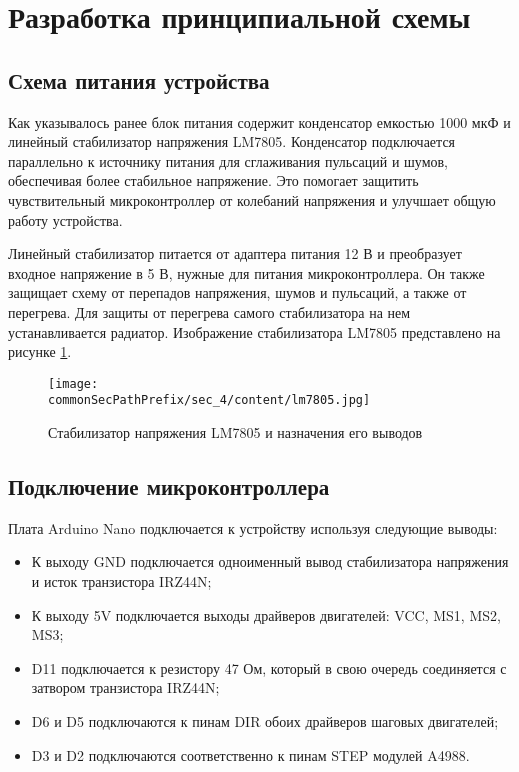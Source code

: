 \section{Разработка принципиальной схемы}
\label{sec:principal}

\subsection{Схема питания устройства}

Как указывалось ранее блок питания содержит конденсатор емкостью 1000 мкФ и линейный стабилизатор напряжения LM7805.
Конденсатор подключается параллельно к источнику питания для сглаживания пульсаций и шумов,
обеспечивая более стабильное напряжение. Это помогает защитить чувствительный микроконтроллер 
от колебаний напряжения и улучшает общую работу устройства.

Линейный стабилизатор питается от адаптера питания 12 В и преобразует входное напряжение в 5 В\cite{LM7805_sheet}, 
нужные для питания микроконтроллера. Он также защищает схему от перепадов напряжения, шумов и пульсаций, 
а также от перегрева\cite{schemt_3}. Для защиты от перегрева самого стабилизатора на нем устанавливается радиатор. 
Изображение стабилизатора LM7805 представлено на рисунке \ref{fig:lm7805}. 
\begin{figure}[ht]
    \centering
    \texttt{[image: \\commonSecPathPrefix/sec\_4/content/lm7805.jpg]}
    \caption{Стабилизатор напряжения LM7805 и назначения его выводов}
    \label{fig:lm7805}
\end{figure}

\subsection{Подключение микроконтроллера}

Плата Arduino Nano подключается к устройству используя следующие выводы:

\begin{itemize}
    \item К выходу GND подключается одноименный вывод стабилизатора напряжения и исток транзистора IRZ44N;
    \item К выходу 5V подключается выходы драйверов двигателей: VCC, MS1, MS2, MS3;
    \item D11 подключается к резистору 47 Ом, который в свою очередь соединяется с затвором транзистора IRZ44N;
    \item D6 и D5 подключаются к пинам DIR обоих драйверов шаговых двигателей;
    \item D3 и D2 подключаются соответственно к пинам STEP модулей A4988.
\end{itemize}

